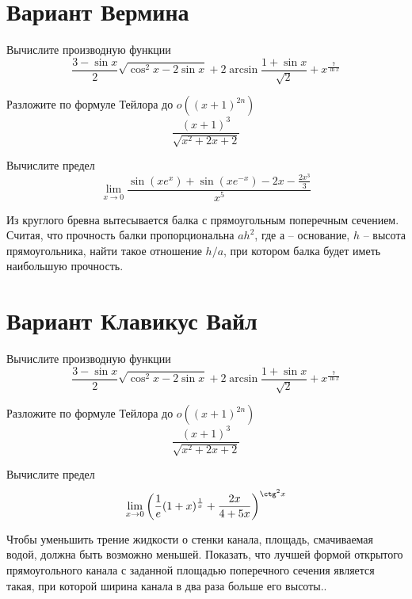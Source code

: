 \documentclass[russian]{article}
\begin{document}
\section*{Вариант Вермина}

Вычислите производную функции
$$\frac{3 - \sin x}{2}\sqrt{\cos^2 x - 2 \sin x} + 2\arcsin \frac{1 + \sin x}{\sqrt{2}} + x^\frac{7}{\ln x}$$

Разложите по формуле Тейлора до $o((x + 1)^{2n})$
$$\frac{(x + 1)^3}{\sqrt{x^2 + 2x + 2}}$$

Вычислите предел
$$\lim_{x \to 0}\frac{\sin(xe^x) + \sin (xe^{-x}) - 2x - \frac{2x^3}{3}}{x^5}$$

Из круглого бревна вытесывается балка с прямоугольным поперечным сечением. Считая, что прочность балки пропорциональна $ah^2$, где $а$ -- основание, $h$ -- высота прямоугольника, найти такое отношение $h/a$, при котором балка будет иметь наибольшую прочность.

\vspace{1cm}
\begin{center}
\end{center}
\newpage

\section*{Вариант Клавикус Вайл}

Вычислите производную функции
$$\frac{3 - \sin x}{2}\sqrt{\cos^2 x - 2 \sin x} + 2\arcsin \frac{1 + \sin x}{\sqrt{2}} + x^\frac{7}{\ln x}$$

Разложите по формуле Тейлора до $o((x + 1)^{2n})$
$$\frac{(x + 1)^3}{\sqrt{x^2 + 2x + 2}}$$

Вычислите предел
$$\lim_{x \to 0} \left(\frac{1}{e}(1 + x)^{\frac{1}{x}} + \frac{2x}{4 + 5x}\right)^{\ctg^2 x} $$

Чтобы уменьшить трение жидкости о стенки канала, площадь, смачиваемая водой, должна быть возможно меньшей. Показать, что лучшей формой открытого прямоугольного канала с заданной площадью поперечного сечения является такая, при которой ширина канала в два раза больше его высоты..
\end{document}
